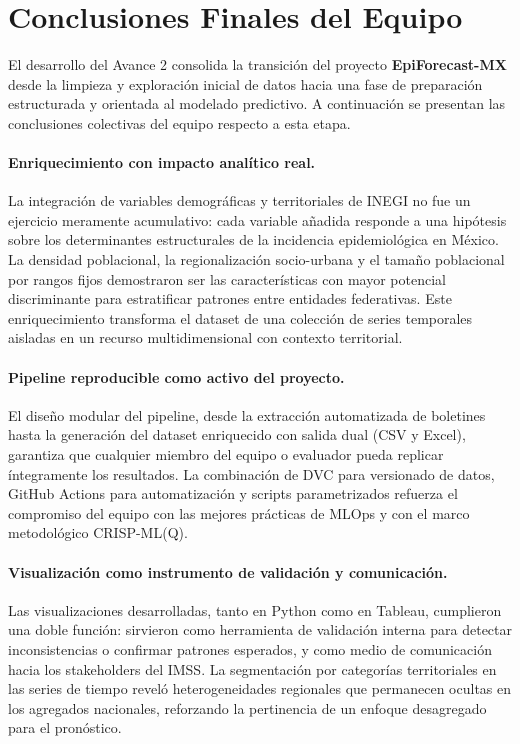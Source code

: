 \documentclass[12pt,letterpaper]{article}
\begin{document}
\section*{Conclusiones Finales del Equipo}

El desarrollo del Avance 2 consolida la transición del proyecto \textbf{EpiForecast-MX} desde la limpieza y exploración inicial de datos hacia una fase de preparación estructurada y orientada al modelado predictivo. A continuación se presentan las conclusiones colectivas del equipo respecto a esta etapa.

\paragraph{Enriquecimiento con impacto analítico real.}
La integración de variables demográficas y territoriales de INEGI no fue un ejercicio meramente acumulativo: cada variable añadida responde a una hipótesis sobre los determinantes estructurales de la incidencia epidemiológica en México. La densidad poblacional, la regionalización socio-urbana y el tamaño poblacional por rangos fijos demostraron ser las características con mayor potencial discriminante para estratificar patrones entre entidades federativas. Este enriquecimiento transforma el dataset de una colección de series temporales aisladas en un recurso multidimensional con contexto territorial.

\paragraph{Pipeline reproducible como activo del proyecto.}
El diseño modular del pipeline, desde la extracción automatizada de boletines hasta la generación del dataset enriquecido con salida dual (CSV y Excel), garantiza que cualquier miembro del equipo o evaluador pueda replicar íntegramente los resultados. La combinación de DVC para versionado de datos, GitHub Actions para automatización y scripts parametrizados refuerza el compromiso del equipo con las mejores prácticas de MLOps y con el marco metodológico CRISP-ML(Q).

\paragraph{Visualización como instrumento de validación y comunicación.}
Las visualizaciones desarrolladas, tanto en Python como en Tableau, cumplieron una doble función: sirvieron como herramienta de validación interna para detectar inconsistencias o confirmar patrones esperados, y como medio de comunicación hacia los stakeholders del IMSS. La segmentación por categorías territoriales en las series de tiempo reveló heterogeneidades regionales que permanecen ocultas en los agregados nacionales, reforzando la pertinencia de un enfoque desagregado para el pronóstico.
\end{document}
